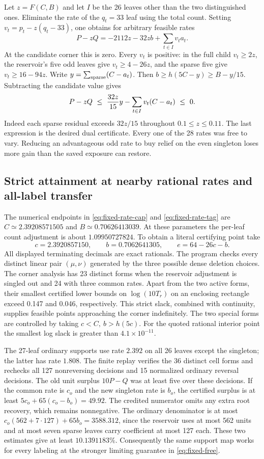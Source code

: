 Let \(z=F(C,B)\) and let \(I\) be the 26 leaves other than the two distinguished ones. Eliminate the rate of the \(q_t=33\) leaf using the total count. Setting \(v_t=p_t-z(q_t-33)\), one obtains for arbitrary feasible rates
\[
 P-zQ=-2112z-32zb+\sum_{t\in I}v_t a_t.
\]
At the candidate corner this is zero. Every \(v_t\) is positive: in the full child \(v_t\ge2z\), the reservoir's five odd leaves give \(v_t\ge4-26z\), and the sparse five give \(v_t\ge16-94z\). Write \(y=\sum_{\rm sparse}(C-a_t)\). Then \(b\ge h(5C-y)\ge B-y/15\). Subtracting the candidate value gives
\[
 P-zQ\ \le\ {32z\over15}y-\sum_{t\in I}v_t(C-a_t)\ \le\ 0.
\]
Indeed each sparse residual exceeds \(32z/15\) throughout \(0.1\le z\le0.11\). The last expression is the desired dual certificate. Every one of the 28 rates was free to vary. Reducing an advantageous odd rate to buy relief on the even singleton loses more gain than the saved exposure can restore.

\subsection{Strict attainment at nearby rational rates and all-label transfer}

The numerical endpoints in \eqref{eq:fixed-rate-cap} and \eqref{eq:fixed-rate-tag}
are \(C\simeq2.39208571505\) and \(B\simeq0.70626413039\). At these parameters the per-leaf count adjustment is about \(1.09950727824\). To obtain a literal certifying point take
\[
 c=2.3920857150,\qquad b=0.7062641305,\qquad e=64-26c-b .
\]
All displayed terminating decimals are exact rationals. The program checks every distinct linear pair \((\mu,\nu)\) generated by the three possible dense deletion choices. The corner analysis has 23 distinct forms when the reservoir adjustment is singled out and 24 with three common rates. Apart from the two active forms, their smallest certified lower bounds on \(\log(10T_r)\) on an enclosing rectangle exceed 0.147 and 0.046, respectively. This strict slack, combined with continuity, supplies feasible points approaching the corner indefinitely. The two special forms are controlled by taking \(c<C,\ b>h(5c)\). For the quoted rational interior point the smallest log slack is greater than \(4.1\times10^{-11}\).

The 27-leaf ordinary supports use rate \(2.392\) on all 26 leaves except the singleton; the latter has rate \(1.808\). The finite replay verifies the 36 distinct cell forms and rechecks all 127 nonreversing decisions and 15 normalized ordinary reversal decisions. The old unit surplus \(10P-Q\) was at least five over these decisions. If the common rate is \(c_o\) and the new singleton rate is \(b_o\), the certified surplus is at least \(5c_o+65(c_o-b_o)=49.92\). The credited numerator omits any extra root recovery, which remains nonnegative. The ordinary denominator is at most \(c_o(562+7\cdot127)+65b_o=3588.312\), since the reservoir uses at most 562 units and at most seven sparse leaves carry coefficient at most 127 each. These two estimates give at least \(10.1391183\%\). Consequently the same support map works for every labeling at the stronger limiting guarantee in \eqref{eq:fixed-free}.

